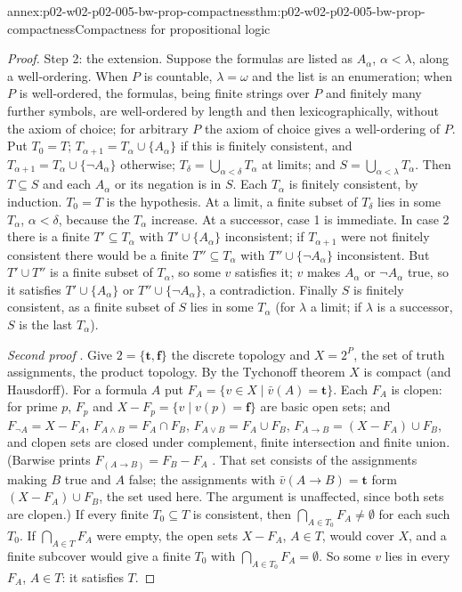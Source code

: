 \begin{annexitem}{annex:p02-w02-p02-005-bw-prop-compactness}{thm:p02-w02-p02-005-bw-prop-compactness}{Compactness for propositional logic}
\begin{proof}
Step 2: the extension.  Suppose the formulas are listed as
\(A_\alpha\), \(\alpha<\lambda\), along a well-ordering.  When \(P\) is
countable, \(\lambda=\omega\) and the list is an enumeration; when \(P\) is
well-ordered, the formulas, being finite strings over \(P\) and finitely
many further symbols, are well-ordered by length and then
lexicographically, without the axiom of choice; for arbitrary \(P\) the
axiom of choice gives a well-ordering of \(P\).  Put \(T_0=T\);
\(T_{\alpha+1}=T_\alpha\cup\{A_\alpha\}\) if this is finitely consistent,
and \(T_{\alpha+1}=T_\alpha\cup\{\neg A_\alpha\}\) otherwise;
\(T_\delta=\bigcup_{\alpha<\delta}T_\alpha\) at limits; and
\(S=\bigcup_{\alpha<\lambda}T_\alpha\).  Then \(T\subseteq S\) and each
\(A_\alpha\) or its negation is in \(S\).  Each \(T_\alpha\) is finitely
consistent, by induction.  \(T_0=T\) is the hypothesis.  At a limit, a
finite subset of \(T_\delta\) lies in some \(T_\alpha\), \(\alpha<\delta\),
because the \(T_\alpha\) increase.  At a successor, case 1 is immediate.
In case 2 there is a finite \(T'\subseteq T_\alpha\) with
\(T'\cup\{A_\alpha\}\) inconsistent; if \(T_{\alpha+1}\) were not finitely
consistent there would be a finite \(T''\subseteq T_\alpha\) with
\(T''\cup\{\neg A_\alpha\}\) inconsistent.  But \(T'\cup T''\) is a finite
subset of \(T_\alpha\), so some \(v\) satisfies it; \(v\) makes
\(A_\alpha\) or \(\neg A_\alpha\) true, so it satisfies
\(T'\cup\{A_\alpha\}\) or \(T''\cup\{\neg A_\alpha\}\), a contradiction.
Finally \(S\) is finitely consistent, as a finite subset of \(S\) lies in
some \(T_\alpha\) (for \(\lambda\) a limit; if \(\lambda\) is a successor,
\(S\) is the last \(T_\alpha\)).

\emph{Second proof} \cite[ch.~A.1, \S4, pp.~27--28]{Barwise1977FirstOrder}.
Give \(2=\{\mathbf t,\mathbf f\}\) the discrete topology and
\(X=2^P\), the set of truth assignments, the product topology.  By the
Tychonoff theorem \(X\) is compact (and Hausdorff).  For a formula \(A\) put
\(F_A=\{v\in X\mid\bar v(A)=\mathbf t\}\).  Each \(F_A\) is clopen: for
prime \(p\), \(F_p\) and \(X-F_p=\{v\mid v(p)=\mathbf f\}\) are basic open
sets; and \(F_{\neg A}=X-F_A\), \(F_{A\land B}=F_A\cap F_B\),
\(F_{A\lor B}=F_A\cup F_B\), \(F_{A\to B}=(X-F_A)\cup F_B\), and clopen sets
are closed under complement, finite intersection and finite union.  (Barwise
prints \(F_{(A\to B)}=F_B-F_A\) \cite[ch.~A.1, \S4, p.~28]{Barwise1977FirstOrder}.
That set consists of the assignments making \(B\) true and \(A\) false; the
assignments with \(\bar v(A\to B)=\mathbf t\) form \((X-F_A)\cup F_B\), the set
used here.  The argument is unaffected, since both sets are clopen.)  If
every finite \(T_0\subseteq T\) is consistent, then
\(\bigcap_{A\in T_0}F_A\neq\emptyset\) for each such \(T_0\).  If
\(\bigcap_{A\in T}F_A\) were empty, the open sets \(X-F_A\), \(A\in T\),
would cover \(X\), and a finite subcover would give a finite \(T_0\) with
\(\bigcap_{A\in T_0}F_A=\emptyset\).  So some \(v\) lies in every \(F_A\),
\(A\in T\): it satisfies \(T\).
\end{proof}
\end{annexitem}


